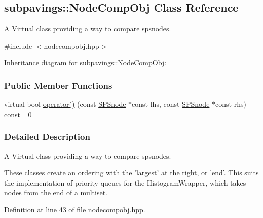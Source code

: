 \hypertarget{classsubpavings_1_1NodeCompObj}{\subsection{subpavings\-:\-:\-Node\-Comp\-Obj \-Class \-Reference}
\label{classsubpavings_1_1NodeCompObj}
}


\-A \-Virtual class providing a way to compare spsnodes.  




{\ttfamily \#include $<$nodecompobj.\-hpp$>$}



\-Inheritance diagram for subpavings\-:\-:\-Node\-Comp\-Obj\-:
\subsubsection*{\-Public \-Member \-Functions}
\begin{DoxyCompactItemize}
\item 
virtual bool \hyperlink{classsubpavings_1_1NodeCompObj_a121d53049c5ed1c0924313951d6aa630}{operator()} (const \hyperlink{classsubpavings_1_1SPSnode}{\-S\-P\-Snode} $\ast$const lhs, const \hyperlink{classsubpavings_1_1SPSnode}{\-S\-P\-Snode} $\ast$const rhs) const =0
\end{DoxyCompactItemize}


\subsubsection{\-Detailed \-Description}
\-A \-Virtual class providing a way to compare spsnodes. 

\-These classes create an ordering with the 'largest' at the right, or 'end'. \-This suits the implementation of priority queues for the \-Histogram\-Wrapper, which takes nodes from the end of a multiset. 

\-Definition at line 43 of file nodecompobj.\-hpp.



